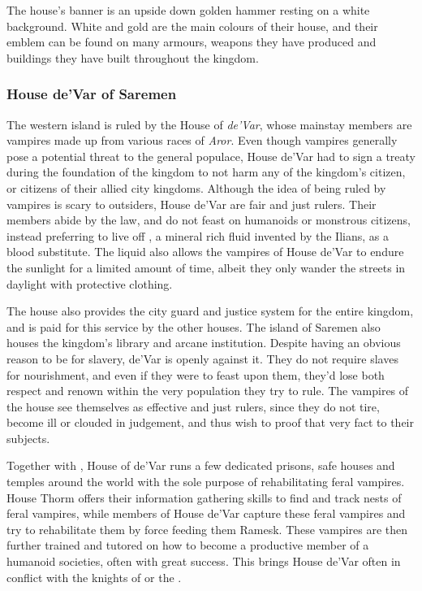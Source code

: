 The house's banner is an upside down golden hammer resting on a white
background. White and gold are the main colours of their house, and their
emblem can be found on many armours, weapons they have produced and buildings
they have built throughout the kingdom.

\subsubsection{House de'Var of Saremen}
\label{sec:House deVar}

The western island is ruled by the House of \emph{de'Var}, whose mainstay
members are vampires made up from various races of \emph{Aror}. Even though
vampires generally pose a potential threat to the general populace, House
de'Var had to sign a treaty during the foundation of the kingdom to not harm
any of the kingdom's citizen, or citizens of their allied city
kingdoms. Although the idea of being ruled by vampires is scary to outsiders,
House de'Var are fair and just rulers. Their members abide by the law, and do
not feast on humanoids or monstrous citizens, instead preferring to live off
, a mineral rich fluid invented by the Ilians, as a blood
substitute. The liquid also allows the vampires of House de'Var to endure the
sunlight for a limited amount of time, albeit they only wander the streets in
daylight with protective clothing.

The house also provides the city guard and justice system for the entire
kingdom, and is paid for this service by the other houses. The island of
Saremen also houses the kingdom's library and arcane institution. Despite
having an obvious reason to be for slavery, de'Var is openly against it. They
do not require slaves for nourishment, and even if they were to feast upon
them, they'd lose both respect and renown within the very population they try
to rule. The vampires of the house see themselves as effective and just
rulers, since they do not tire, become ill or clouded in judgement, and thus
wish to proof that very fact to their subjects.

Together with , House of de'Var runs a few dedicated
prisons, safe houses and temples around the world with the sole purpose of
rehabilitating feral vampires. House Thorm offers their information gathering
skills to find and track nests of feral vampires, while members of House
de'Var capture these feral vampires and try to rehabilitate them by force
feeding them Ramesk. These vampires are then further trained and tutored on
how to become a productive member of a humanoid societies, often with great
success. This brings House de'Var often in conflict with the knights of
 or the .

